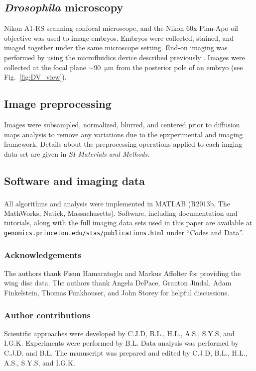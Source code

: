 \documentclass[twocolumn, 10pt]{article}
\newcommand{\SI}[0]{\textit{SI Materials and Methods}}
\newcommand{\fig}[0]{Fig.}
\begin{document}
\subsection*{{\em Drosophila} microscopy}
%
Nikon A1-RS scanning confocal microscope, and the Nikon 60x Plan-Apo oil objective was used to image embryos. 
%
Embryos were collected, stained, and imaged together under the same microscope setting. 
%
End-on imaging was performed by using the microfluidics device described previously \citep{chung2010microfluidic}.
%
Images were collected at the focal plane $\sim$90~$\mathrm{\mu m}$ from the posterior pole of an embryo (see \fig~\ref{fig:DV_view}).  

\subsection*{Image preprocessing}

Images were subsampled, normalized, blurred, and centered prior to diffusion maps analysis to remove any variations due to the epxperimental and imaging framework. 
%
Details about the preprocessing operations applied to each imging data set are given in \SI. 


\subsection*{Software and imaging data}
%
All algorithms and analysis were implemented in MATLAB\textsuperscript{\textregistered} (R2013b, The MathWorks, Natick, Massachusetts).
%
Software, including documentation and tutorials, along with the full imaging data sets used in this paper are available at \texttt{genomics.princeton.edu/stas/publications.html} under ``Codes and Data''. 




\subsubsection*{Acknowledgements}

The authors thank Fisun Hamaratoglu and Markus Affolter for providing the wing disc data. 
%
The authors thank Angela DePace, Granton Jindal, Adam Finkelstein,  Thomas Funkhouser, and John Storey for helpful discussions. 


\subsubsection*{Author contributions}
Scientific approaches were developed by C.J.D, B.L., H.L., A.S., S.Y.S, and I.G.K.
%
Experiments were performed by B.L.
%
Data analysis was performed by C.J.D. and B.L.
%
The manuscript was prepared and edited by C.J.D, B.L., H.L., A.S., S.Y.S, and I.G.K.
\end{document}

